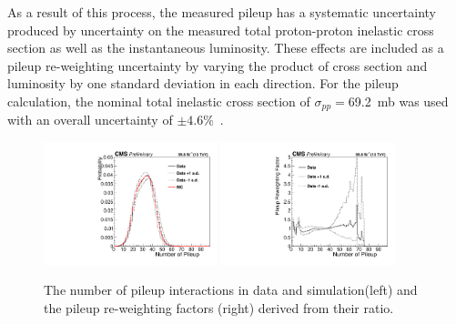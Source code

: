 As a result of this process, the measured pileup has a systematic uncertainty produced by uncertainty on the measured total proton-proton inelastic cross section as well as the instantaneous luminosity. 
These effects are included as a pileup re-weighting uncertainty by varying the product of cross section and luminosity by one standard deviation in each direction.
For the pileup calculation, the nominal total inelastic cross section of $\sigma_{pp}=$\SI{69.2}{\milli\barn} was used with an overall uncertainty of $\pm4.6\%$~\cite{pileupCx}.

\begin{figure}[ht]
	\centering
	\includegraphics[width=0.45\textwidth]{figures/PileupDists.pdf}
	\hspace{0.01\textwidth}
	\includegraphics[width=0.45\textwidth]{figures/PileupRatioDists.pdf}
        \caption[Pileup Re-weighting Histograms]{The number of pileup interactions in data and simulation(left) and the pileup re-weighting factors (right) derived from their ratio.}
        \label{fig:pileup}
\end{figure}

